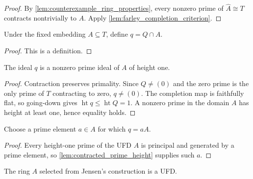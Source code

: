 \begin{proof}
  By \cref{lem:counterexample_ring_properties}, every nonzero prime of
  \(\widehat A\cong T\) contracts nontrivially to \(A\).  Apply
  \cref{lem:farley_completion_criterion}.
\end{proof}

\begin{definition}
  \label{def:contracted_prime}
  Under the fixed embedding \(A\subseteq T\), define \(q=Q\cap A\).
\end{definition}

\begin{proof}
  This is a definition.
\end{proof}

\begin{lemma}
  \label{lem:contracted_prime_height}
  The ideal \(q\) is a nonzero prime ideal of \(A\) of height one.
\end{lemma}

\begin{proof}
  Contraction preserves primality.  Since \(Q\neq(0)\) and the zero prime is
  the only prime of \(T\) contracting to zero, \(q\neq(0)\).  The completion
  map is faithfully flat, so going-down gives
  \(\operatorname{ht}q\leq\operatorname{ht}Q=1\).  A nonzero prime in the
  domain \(A\) has height at least one, hence equality holds.
\end{proof}

\begin{definition}
  \label{def:prime_generator}
  Choose a prime element \(a\in A\) for which \(q=aA\).
\end{definition}

\begin{proof}
  Every height-one prime of the UFD \(A\) is principal and generated by a
  prime element, so \cref{lem:contracted_prime_height} supplies such \(a\).
\end{proof}

\begin{lemma}
  \label{lem:jensen_special_case_ufd_source}
  The ring \(A\) selected from Jensen's construction is a UFD.
\end{lemma}

